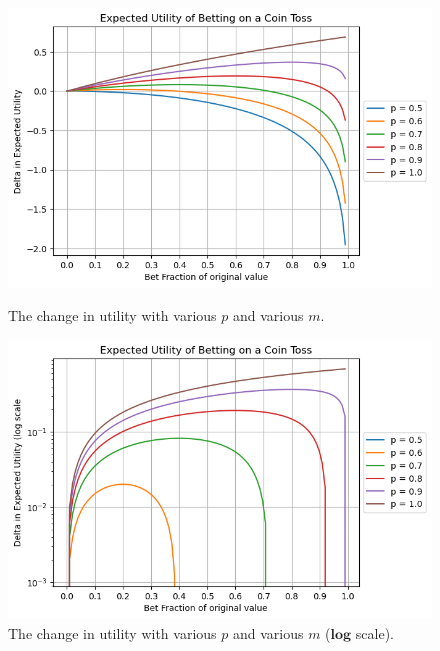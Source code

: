 \documentclass[13pt, reqno]{amsart}
\begin{document}
\begin{problem}[3]
\begin{figure}[H]
    \includegraphics[width=150mm]{output-linear.png}
    \caption{The change in utility with various $p$ and various $m$.}

    \medskip

    \includegraphics[width=150mm]{output-log.png}
    \caption{The change in utility with various $p$ and various $m$ ($\mathbf{log}$ scale).}


  \end{figure}

\end{problem}
\end{document}
